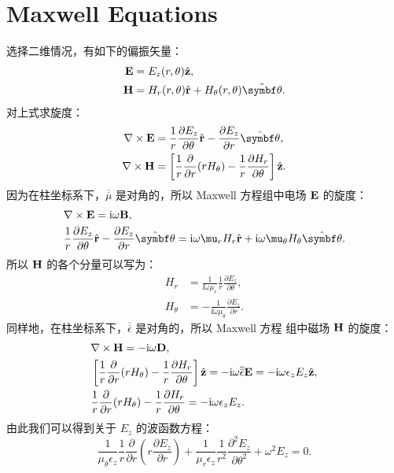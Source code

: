 
\chapter{Maxwell Equations}

选择二维情况，有如下的偏振矢量：
\begin{subequations}
  \begin{align}
    {\bf E} &= E_z(r, \theta) \hat{\bf z}, \\
    {\bf H} &= H_r(r, \theta) \hat{\bf r} + H_\theta(r, \theta) \hat{\bm\theta}.
  \end{align}
\end{subequations}
对上式求旋度：
\begin{subequations}
  \begin{align}
    \nabla \times {\bf E} &= \frac{1}{r} \frac{\partial E_z}{\partial\theta}
      \hat{\bf r} - \frac{\partial E_z}{\partial r} \hat{\bm\theta}, \\
    \nabla \times {\bf H} &= \left[\frac{1}{r} \frac{\partial}{\partial r}
      (r H_\theta) - \frac{1}{r} \frac{\partial H_r}{\partial\theta} \right]
      \hat{\bf z}.
  \end{align}
\end{subequations}
因为在柱坐标系下，$\overline{\overline\mu}$ 是对角的，所以 Maxwell 方程组中电场
$\bf E$ 的旋度：
\begin{subequations}
  \begin{align}
    & \nabla \times {\bf E} = \ii \omega {\bf B}, \\
    & \frac{1}{r} \frac{\partial E_z}{\partial\theta} \hat{\bf r} -
      \frac{\partial E_z}{\partial r}\hat{\bm\theta} = \ii \omega \mu_r H_r
      \hat{\bf r} + \ii \omega \mu_\theta H_\theta \hat{\bm\theta}.
  \end{align}
\end{subequations}
所以 $\bf H$ 的各个分量可以写为：
\begin{subequations}
  \begin{align}
    H_r &= \frac{1}{\ii \omega \mu_r} \frac{1}{r}
      \frac{\partial E_z}{\partial\theta}, \\
    H_\theta &= -\frac{1}{\ii \omega \mu_\theta}
      \frac{\partial E_z}{\partial r}.
  \end{align}
\end{subequations}
同样地，在柱坐标系下，$\overline{\overline\epsilon}$ 是对角的，所以 Maxwell 方程
组中磁场 $\bf H$ 的旋度：
\begin{subequations}
  \begin{align}
    & \nabla \times {\bf H} = -\mathrm{i} \omega {\bf D}, \\
    & \left[\frac{1}{r} \frac{\partial}{\partial r}(r H_\theta) - \frac{1}{r}
      \frac{\partial H_r}{\partial\theta} \right] \hat{\bf z} = -\mathrm{i} \omega
      {\overline{\overline\epsilon}} {\bf E} = -\mathrm{i} \omega \epsilon_z E_z
      \hat{\bf z}, \\
    & \frac{1}{r} \frac{\partial}{\partial r}(r H_\theta) - \frac{1}{r}
      \frac{\partial H_r}{\partial\theta} = -\mathrm{i} \omega \epsilon_z E_z.
  \end{align}
\end{subequations}
由此我们可以得到关于 $E_z$ 的波函数方程：
\begin{equation}
  \frac{1}{\mu_\theta \epsilon_z} \frac{1}{r} \frac{\partial}{\partial r}
  \left(r \frac{\partial E_z}{\partial r} \right) + \frac{1}{\mu_r \epsilon_z}
  \frac{1}{r^2} \frac{\partial^2E_z}{\partial\theta^2} +\omega^2 E_z = 0.
\end{equation}
